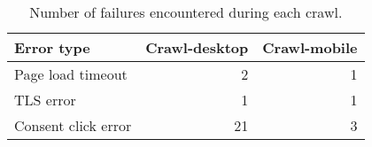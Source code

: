 \begin{table}[ht] 
\caption{Number of failures encountered during each crawl.} 
\centering 
\begin{tabular}{|l|r|r|} 
\hline 
\textbf{Error type} & \multicolumn{1}{l|}{\textbf{Crawl-desktop}} & \multicolumn{1}{l|}{\textbf{Crawl-mobile}} \\ \hline 
Page load timeout & 2 & 1 \\ \hline 
TLS error & 1 & 1 \\ \hline 
Consent click error & 21 & 3 \\ \hline 
\end{tabular} 
\label{table:NumberOfFailures} 
\end{table}